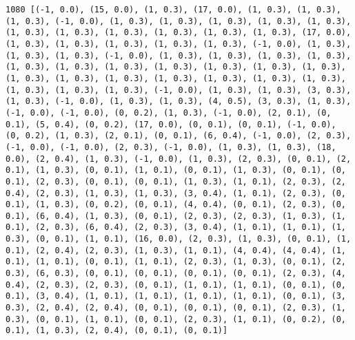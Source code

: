 \documentclass[11pt]{article}
\begin{document}
\begin{Verbatim}[commandchars=\\\{\}]
1080 [(-1, 0.0), (15, 0.0), (1, 0.3), (17, 0.0), (1, 0.3), (1, 0.3), (1, 0.3), (-1, 0.0), (1, 0.3), (1, 0.3), (1, 0.3), (1, 0.3), (1, 0.3), (1, 0.3), (1, 0.3), (1, 0.3), (1, 0.3), (1, 0.3), (1, 0.3), (17, 0.0), (1, 0.3), (1, 0.3), (1, 0.3), (1, 0.3), (1, 0.3), (-1, 0.0), (1, 0.3), (1, 0.3), (1, 0.3), (-1, 0.0), (1, 0.3), (1, 0.3), (1, 0.3), (1, 0.3), (1, 0.3), (1, 0.3), (1, 0.3), (1, 0.3), (1, 0.3), (1, 0.3), (1, 0.3), (1, 0.3), (1, 0.3), (1, 0.3), (1, 0.3), (1, 0.3), (1, 0.3), (1, 0.3), (1, 0.3), (1, 0.3), (1, 0.3), (-1, 0.0), (1, 0.3), (1, 0.3), (3, 0.3), (1, 0.3), (-1, 0.0), (1, 0.3), (1, 0.3), (4, 0.5), (3, 0.3), (1, 0.3), (-1, 0.0), (-1, 0.0), (0, 0.2), (1, 0.3), (-1, 0.0), (2, 0.1), (0, 0.1), (5, 0.4), (0, 0.2), (17, 0.0), (0, 0.1), (0, 0.1), (-1, 0.0), (0, 0.2), (1, 0.3), (2, 0.1), (0, 0.1), (6, 0.4), (-1, 0.0), (2, 0.3), (-1, 0.0), (-1, 0.0), (2, 0.3), (-1, 0.0), (1, 0.3), (1, 0.3), (18, 0.0), (2, 0.4), (1, 0.3), (-1, 0.0), (1, 0.3), (2, 0.3), (0, 0.1), (2, 0.1), (1, 0.3), (0, 0.1), (1, 0.1), (0, 0.1), (1, 0.3), (0, 0.1), (0, 0.1), (2, 0.3), (0, 0.1), (0, 0.1), (1, 0.3), (1, 0.1), (2, 0.3), (2, 0.4), (2, 0.3), (1, 0.3), (1, 0.3), (3, 0.4), (1, 0.1), (2, 0.3), (0, 0.1), (1, 0.3), (0, 0.2), (0, 0.1), (4, 0.4), (0, 0.1), (2, 0.3), (0, 0.1), (6, 0.4), (1, 0.3), (0, 0.1), (2, 0.3), (2, 0.3), (1, 0.3), (1, 0.1), (2, 0.3), (6, 0.4), (2, 0.3), (3, 0.4), (1, 0.1), (1, 0.1), (1, 0.3), (0, 0.1), (1, 0.1), (16, 0.0), (2, 0.3), (1, 0.3), (0, 0.1), (1, 0.1), (2, 0.4), (2, 0.3), (1, 0.3), (1, 0.1), (4, 0.4), (4, 0.4), (1, 0.1), (1, 0.1), (0, 0.1), (1, 0.1), (2, 0.3), (1, 0.3), (0, 0.1), (2, 0.3), (6, 0.3), (0, 0.1), (0, 0.1), (0, 0.1), (0, 0.1), (2, 0.3), (4, 0.4), (2, 0.3), (2, 0.3), (0, 0.1), (1, 0.1), (1, 0.1), (0, 0.1), (0, 0.1), (3, 0.4), (1, 0.1), (1, 0.1), (1, 0.1), (1, 0.1), (0, 0.1), (3, 0.3), (2, 0.4), (2, 0.4), (0, 0.1), (0, 0.1), (0, 0.1), (2, 0.3), (1, 0.3), (0, 0.1), (1, 0.1), (0, 0.1), (2, 0.3), (1, 0.1), (0, 0.2), (0, 0.1), (1, 0.3), (2, 0.4), (0, 0.1), (0, 0.1)]

\end{Verbatim}
\end{document}
